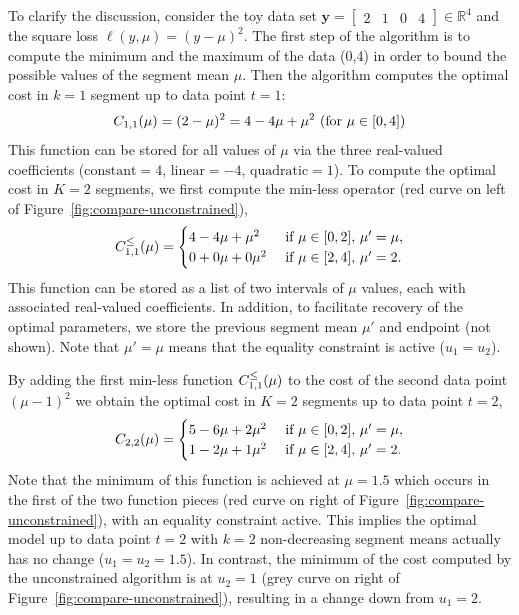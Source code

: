 \documentclass[aoas]{imsart}
\newcommand{\RR}{\mathbb R}
\begin{document}
To clarify the discussion, consider the 
toy data set $\mathbf y= \left[
\begin{array}{cccccc}
  2 & 1 & 0 & 4
\end{array}
\right] \in\RR^4$ and the square loss $\ell(y,\mu)=(y-\mu)^2$. The first
step of the algorithm is to compute the minimum and the maximum of the
data (0,4) in order to bound the possible values of the segment
mean $\mu$. Then the algorithm computes the optimal cost in $k=1$ segment up
to data point $t=1$:
\begin{equation}
  \FCC_{1,1}(\mu) = (2-\mu)^2=4 - 4\mu + \mu^2\text{ (for $\mu\in[0,4]$)}
\end{equation}
This function can be stored for all values of $\mu$ via the three
real-valued coefficients ($\text{constant}=4$, $\text{linear}=-4$,
$\text{quadratic}=1$). To compute the optimal cost in $K=2$ segments,
we first compute the min-less operator (red curve on left of
Figure~\ref{fig:compare-unconstrained}),
\begin{equation}
  \FCC_{1,1}^\leq(\mu) =
  \begin{cases}
    4 - 4\mu + \mu^2 &\text{ if }\mu\in[0,2],\, \mu'=\mu,\\
    0 + 0\mu + 0\mu^2 & \text{ if }\mu\in[2,4],\,  \mu'=2.
  \end{cases}
\end{equation}
This function can be stored as a list of two
intervals of $\mu$ values, each with associated real-valued
coefficients. In addition, to facilitate recovery of the optimal
parameters, we store the previous segment mean $\mu'$ and endpoint
(not shown). Note that $\mu'=\mu$ means that the equality constraint
is active ($u_1=u_2$).


By adding the first min-less function $C_{1,1}^\leq(\mu)$ to the
cost of the second data point $(\mu-1)^2$ we obtain the optimal cost in $K=2$
segments up to data point $t=2$,
\begin{equation}
  \FCC_{2,2}(\mu) = 
  \begin{cases}
    5 - 6\mu + 2\mu^2 &\text{ if }\mu\in[0,2],\,  \mu'=\mu,\\
    1 - 2\mu + 1\mu^2 &\text{ if }\mu\in[2,4],\,  \mu'=2.
  \end{cases}
\end{equation}
Note that the minimum of this function is achieved at $\mu=1.5$ which
occurs in the first of the two function pieces (red curve on right of
Figure~\ref{fig:compare-unconstrained}), with an equality constraint
active. This implies the optimal model up to data point $t=2$ with
$k=2$ non-decreasing segment means actually has no change
($u_1=u_2=1.5$). In contrast, the minimum of the cost computed by the
unconstrained algorithm is at $u_2=1$ (grey curve on right of
Figure~\ref{fig:compare-unconstrained}), resulting in a change down
from $u_1=2$.
\end{document}
